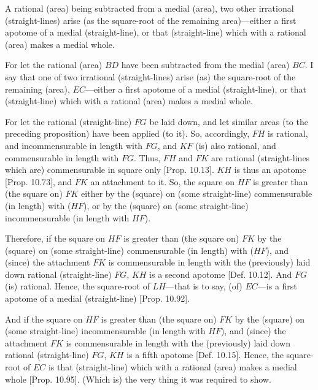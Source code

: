 \begin{Parallel}{}{}
{A rational (area) being subtracted from
a medial (area), two other irrational (straight-lines) arise (as the square-root
of the remaining area)---either a first apotome of a medial (straight-line),
or that (straight-line) which with a rational (area) makes a medial whole.

For let the rational (area) $BD$ have been subtracted from the medial
(area) $BC$. I say that one of two irrational (straight-lines) arise (as) the square-root of the remaining (area), $EC$---either a first apotome of a medial
(straight-line), or that (straight-line) which with a rational (area) makes
a medial whole.

For let the rational (straight-line) $FG$ be laid down, and let
similar areas (to the preceding proposition) have  been applied (to it). So,
accordingly, $FH$ is rational, and incommensurable in length with
$FG$, and $KF$ (is) also rational, and commensurable
in length with $FG$. Thus, $FH$ and $FK$ are rational (straight-lines which
are) commensurable in square only [Prop. 10.13].
$KH$ is thus an apotome [Prop. 10.73], and $FK$ an attachment to it. So, the square on $HF$ is greater than (the square on)
$FK$ either by the (square) on (some straight-line) commensurable (in length)
with ($HF$), or by the (square) on (some straight-line) incommensurable
(in length with $HF$).

\centerline{}

Therefore, if the square on $HF$ is greater than (the square on) $FK$
by the (square) on (some straight-line) commensurable (in length) with ($HF$),
and (since) the attachment $FK$ is commensurable
in length with the (previously) laid down rational (straight-line) $FG$,
$KH$ is a second apotome [Def. 10.12]. 
And $FG$ (is) rational. Hence, the square-root of $LH$---that is to say, (of)
$EC$---is a first apotome of a medial (straight-line) [Prop. 10.92].

And if the square on $HF$ is greater than (the square on) $FK$
by the (square) on (some straight-line) incommensurable (in length with $HF$),
and (since) the attachment $FK$ is commensurable
in length with the (previously) laid down rational (straight-line) $FG$,
$KH$ is a fifth apotome [Def. 10.15]. Hence,
the square-root of $EC$ is that (straight-line) which with a rational (area)
makes a medial whole [Prop. 10.95]. 
(Which is) the very thing it was required to show.}
\end{Parallel}

